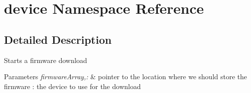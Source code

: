 \hypertarget{namespacedevice}{\section{device Namespace Reference}
\label{namespacedevice}
}


\subsection{Detailed Description}
Starts a firmware download 
\begin{DoxyParams}{Parameters}
{\em firmware\-Array,\-:} & pointer to the location where we should store the firmware \-: the device to use for the download \\
\hline
\end{DoxyParams}
